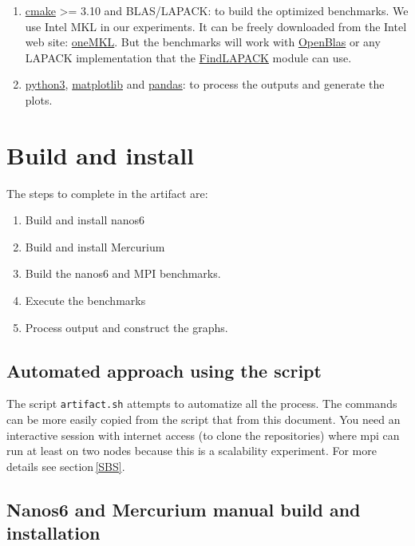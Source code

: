 \documentclass{article}
\newcommand{\code}[1]{\texttt{#1}}
\begin{document}
\begin{enumerate}
    \item \href{https://cmake.org/}{cmake} >= 3.10 and BLAS/LAPACK: to build
        the optimized benchmarks.  We use Intel MKL in our experiments.
        It can be freely downloaded from the Intel web site:
        \href{https://www.intel.com/content/www/us/en/developer/tools/oneapi/onemkl-download.html}{oneMKL}.
        But the benchmarks will work with \href{https://www.openblas.net/}{OpenBlas}
        or any LAPACK implementation that the
        \href{https://cmake.org/cmake/help/latest/module/FindLAPACK.html}{FindLAPACK}
        module can use.

    \item \href{https://www.python.org/downloads/}{python3},
        \href{https://matplotlib.org/}{matplotlib} and
        \href{https://pandas.pydata.org/}{pandas}: to process the outputs
        and generate the plots.

\end{enumerate}

\section{Build and install}

The steps to complete in the artifact are:

\begin{enumerate}
    \item Build and install nanos6
    \item Build and install Mercurium
    \item Build the nanos6 and MPI benchmarks.
    \item Execute the benchmarks
    \item Process output and construct the graphs.
\end{enumerate}

\subsection{Automated approach using the script}

The script \code{artifact.sh} attempts to automatize all the process.
The commands can be more easily copied from the script that from this
document.  You need an interactive session with internet access (to
clone the repositories) where mpi can run at least on two nodes
because this is a scalability experiment.  For more details see
section\,\ref{SBS}.

\subsection{Nanos6 and Mercurium manual build and installation}\label{manuallib}
\end{document}
